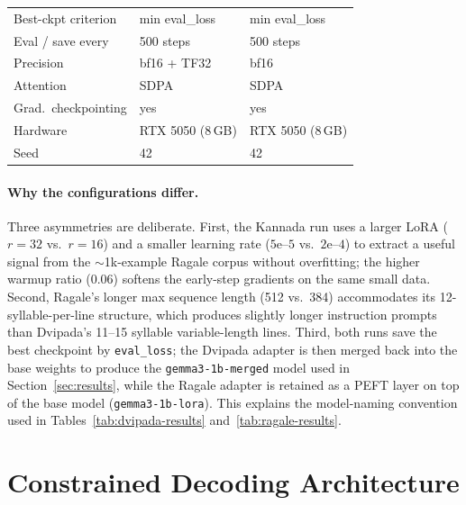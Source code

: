 \documentclass[11pt]{article}
\begin{document}
\begin{table}[t]
{\begin{tabular}{lll}
Best-ckpt criterion  & min eval\_loss         & min eval\_loss         \\
Eval / save every    & 500 steps              & 500 steps              \\
\midrule
Precision            & bf16 + TF32            & bf16                   \\
Attention            & SDPA                   & SDPA                   \\
Grad.\ checkpointing & yes                    & yes                    \\
Hardware             & RTX 5050 (8\,GB)       & RTX 5050 (8\,GB)       \\
Seed                 & 42                     & 42                     \\
\bottomrule
\end{tabular}%
}
\end{table}

\paragraph{Why the configurations differ.}
Three asymmetries are deliberate. First, the Kannada run uses a larger
LoRA ($r{=}32$ vs.\ $r{=}16$) and a smaller learning rate
($5\text{e--}5$ vs.\ $2\text{e--}4$) to extract a useful signal from
the $\sim$1k-example Ragale corpus without overfitting; the higher
warmup ratio ($0.06$) softens the early-step gradients on the same
small data. Second, Ragale's longer max sequence length (512 vs.\ 384)
accommodates its 12-syllable-per-line structure, which produces
slightly longer instruction prompts than Dvipada's 11--15 syllable
variable-length lines. Third, both runs save the best checkpoint by
\texttt{eval\_loss}; the Dvipada adapter is then merged back into the
base weights to produce the \texttt{gemma3-1b-merged} model used in
Section~\ref{sec:results}, while the Ragale adapter is retained as a
PEFT layer on top of the base model (\texttt{gemma3-1b-lora}). This
explains the model-naming convention used in
Tables~\ref{tab:dvipada-results} and~\ref{tab:ragale-results}.

\section{Constrained Decoding Architecture}
\label{sec:constrained}
\end{document}
